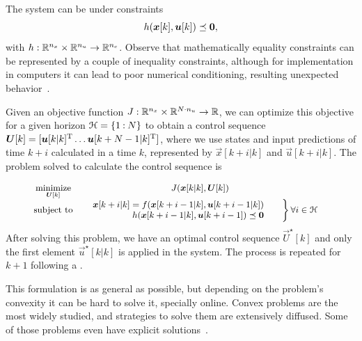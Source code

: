 \documentclass[../main.tex]{subfiles}
\begin{document}
The system can be under constraints
\begin{equation}
 h(\boldsymbol{x}[k],\boldsymbol{u}[k])\preceq\mathbf{0},
\end{equation}
with $h:\mathbb{R}^{n_{x}}\times\mathbb{R}^{n_{u}}\to\mathbb{R}^{n_{c}}$. Observe that mathematically equality constraints can be represented by a couple of inequality constraints, although for implementation in computers it can lead to poor numerical conditioning, resulting unexpected behavior~\cite{BorrelliEtAl2017}.

Given an objective function $J:\mathbb{R}^{n_{x}}\times\mathbb{R}^{N\cdot n_{u}}\to \mathbb{R}$, we can optimize this objective for a given horizon $\mathcal{H}=\{1\mathbin{:}N\}$ to obtain a control sequence $\boldsymbol{U}[k]=[\boldsymbol{u}[k|k]^{\mathrm{T}} \dots \boldsymbol{u}[k+N-1|k]^{\mathrm{T}}]$, where
we use states and input predictions of time $k+i$ calculated in a time $k$, represented by $\vec{x}[k+i|k]$ and $\vec{u}[k+i|k]$. The problem solved to calculate the control sequence is

\begin{equation}\label{eq:general_mpc}
  \small
  \begin{aligned}
    \begin{matrix}
      \underset{\boldsymbol{U}[k]}{\mathrm{minimize}} & J(\boldsymbol{x}[k|k],\boldsymbol{U}[k])&\\
      \mathrm{subject~ to} &

      \left.  \begin{aligned}
          \quad \boldsymbol{x}[k+i|k]=f(\boldsymbol{x}[k+i-1|k],\boldsymbol{u}[k+i-1|k])\\
          \quad                h(\boldsymbol{x}[k+i-1|k],\boldsymbol{u}[k+i-1])\preceq\mathbf{0}
        \end{aligned}\qquad        \right\}

      \begin{aligned}
        \forall i\in\mathcal{H}
      \end{aligned}
    \end{matrix}
  \end{aligned}
\end{equation}
After solving this problem, we have an optimal control sequence $\vec{U}^{\star}[k]$ and only the first element $\vec{u}^{\star}[k|k]$ is applied in the system. The process is repeated for $k+1$ following a \rhs.

This formulation is as general as possible, but depending on the problem's convexity it can be hard to solve it, specially online.
Convex problems are the most widely studied, and strategies to solve them are extensively diffused. Some of those problems even have explicit solutions~\cite{BoydVandenberghe2004}.
\end{document}
